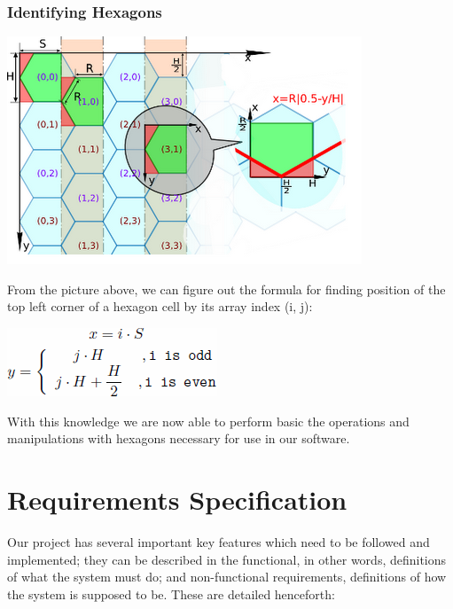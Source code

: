 \documentclass[10pt,a4paper]{article}
\begin{document}
\subsubsection{Identifying Hexagons}
\begin{center}
\includegraphics[scale=0.5]{image10.png}\\
\end{center}
From the picture above, we can figure out the formula for finding position of the top left corner of a hexagon cell by its array index (i, j):\\
\begin{center}
\includegraphics[scale=0.5]{image16.png}\\
\end{center}
With this knowledge we are now able to perform basic the operations and manipulations with hexagons necessary for use in our software.
\section{Requirements Specification}
Our project has several important key features which need to be followed and implemented; they can be described in the functional, in other words, definitions of what the system must do; and non-functional requirements, definitions of how the system is supposed to be. These are detailed henceforth:
\end{document}
